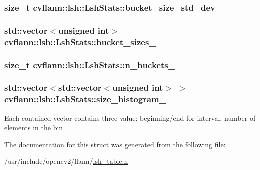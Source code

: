 \hypertarget{structcvflann_1_1lsh_1_1LshStats_aafce95661b13b73242cd2b65130f83ec}{
\subsubsection[{bucket\-\_\-size\-\_\-std\-\_\-dev}]{\setlength{\rightskip}{0pt plus 5cm}size\-\_\-t cvflann\-::lsh\-::\-Lsh\-Stats\-::bucket\-\_\-size\-\_\-std\-\_\-dev}}\label{structcvflann_1_1lsh_1_1LshStats_aafce95661b13b73242cd2b65130f83ec}
\hypertarget{structcvflann_1_1lsh_1_1LshStats_a1b5377341a9c08fb76658aace06c085d}{
\subsubsection[{bucket\-\_\-sizes\-\_\-}]{\setlength{\rightskip}{0pt plus 5cm}std\-::vector$<$unsigned int$>$ cvflann\-::lsh\-::\-Lsh\-Stats\-::bucket\-\_\-sizes\-\_\-}}\label{structcvflann_1_1lsh_1_1LshStats_a1b5377341a9c08fb76658aace06c085d}
\hypertarget{structcvflann_1_1lsh_1_1LshStats_ac61b04700a3dea30d323959676749573}{
\subsubsection[{n\-\_\-buckets\-\_\-}]{\setlength{\rightskip}{0pt plus 5cm}size\-\_\-t cvflann\-::lsh\-::\-Lsh\-Stats\-::n\-\_\-buckets\-\_\-}}\label{structcvflann_1_1lsh_1_1LshStats_ac61b04700a3dea30d323959676749573}
\hypertarget{structcvflann_1_1lsh_1_1LshStats_aeb9f127c44c04570068470403992305d}{
\subsubsection[{size\-\_\-histogram\-\_\-}]{\setlength{\rightskip}{0pt plus 5cm}std\-::vector$<$std\-::vector$<$unsigned int$>$ $>$ cvflann\-::lsh\-::\-Lsh\-Stats\-::size\-\_\-histogram\-\_\-}}\label{structcvflann_1_1lsh_1_1LshStats_aeb9f127c44c04570068470403992305d}
Each contained vector contains three value\-: beginning/end for interval, number of elements in the bin 

The documentation for this struct was generated from the following file\-:\begin{DoxyCompactItemize}
\item 
/usr/include/opencv2/flann/\hyperlink{lsh__table_8h}{lsh\-\_\-table.\-h}\end{DoxyCompactItemize}
